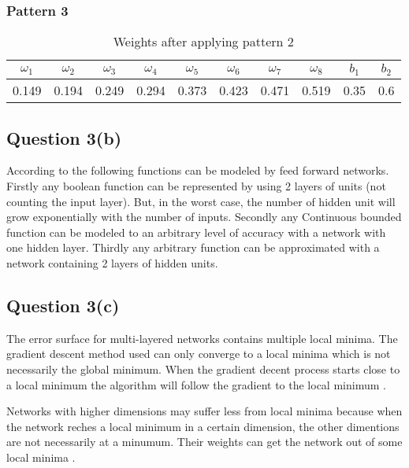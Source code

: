 \documentclass[10pt,a4paper]{article}
\begin{document}
\subsubsection{Pattern 3}
\begin{table}
\begin{tabular}{|c|c|c|c|c|c|c|c|c|c|}
\hline
$\omega_1$ & $\omega_2$ & $\omega_3$ & $\omega_4$ & $\omega_5$ & $\omega_6$ & $\omega_7$ & $\omega_8$ & $b_1$ & $b_2$\\
\hline
0.149 &0.194 &0.249 & 0.294 & 0.373 & 0.423 & 0.471 & 0.519 & 0.35 & 0.6 \\
\hline
\end{tabular}
\caption{Weights after applying pattern 2}\label{tablep3}
\end{table}

















\subsection{Question 3(b)}

According to \cite{Michell2009} the following functions can be modeled by feed forward networks. Firstly any boolean function can be represented by using 2 layers of units (not counting the input layer). But, in the worst case, the number of hidden unit will grow exponentially with the number of inputs. Secondly any Continuous bounded function can be modeled to an arbitrary level of accuracy with a network with one hidden layer. Thirdly any arbitrary function can be approximated with a network containing 2 layers of hidden units.
 
\subsection{Question 3(c)}

The error surface for multi-layered networks contains multiple local minima. The gradient descent method used can only converge to a local minima which is not necessarily the global minimum. When the gradient decent process starts close to a local minimum the algorithm will follow the gradient to the local minimum  \citep{Michell2009}.

Networks with higher dimensions may suffer less from local minima because when the network reches a local minimum in a certain dimension, the other dimentions are not necessarily at a minumum. Their weights can get the network out of some local minima  \citep{Michell2009}.
 
\end{document}
